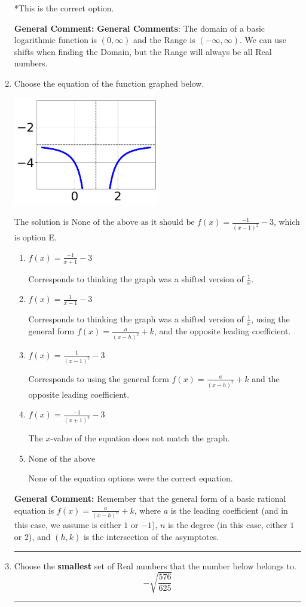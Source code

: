 \documentclass{extbook}[14pt]
\newcommand{\litem}[1]{\item #1

\rule{\textwidth}{0.4pt}}
\begin{document}
\begin{enumerate}
{\begin{enumerate}[label=\Alph*.]
*This is the correct option.
\end{enumerate}

\textbf{General Comment:} \textbf{General Comments}: The domain of a basic logarithmic function is $(0, \infty)$ and the Range is $(-\infty, \infty)$. We can use shifts when finding the Domain, but the Range will always be all Real numbers.
}
\litem{
Choose the equation of the function graphed below.

\begin{center}
    \includegraphics[width=0.5\textwidth]{../Figures/rationalGraphToEquationA.png}
\end{center}




The solution is \( \text{None of the above as it should be } f(x) = \frac{-1}{(x - 1)^2} - 3 \), which is option E.\begin{enumerate}[label=\Alph*.]
\item \( f(x) = \frac{-1}{x + 1} - 3 \)

Corresponds to thinking the graph was a shifted version of $\frac{1}{x}$.
\item \( f(x) = \frac{1}{x - 1} - 3 \)

Corresponds to thinking the graph was a shifted version of $\frac{1}{x}$, using the general form $f(x) = \frac{a}{(x-h)^2}+k$, and the opposite leading coefficient.
\item \( f(x) = \frac{1}{(x - 1)^2} - 3 \)

Corresponds to using the general form $f(x) = \frac{a}{(x-h)^2}+k$ and the opposite leading coefficient.
\item \( f(x) = \frac{-1}{(x + 1)^2} - 3 \)

The $x$-value of the equation does not match the graph.
\item \( \text{None of the above} \)

None of the equation options were the correct equation.
\end{enumerate}

\textbf{General Comment:} Remember that the general form of a basic rational equation is $ f(x) = \frac{a}{(x-h)^n} + k$, where $a$ is the leading coefficient (and in this case, we assume is either $1$ or $-1$), $n$ is the degree (in this case, either $1$ or $2$), and $(h, k)$ is the intersection of the asymptotes.
}
\litem{
Choose the \textbf{smallest} set of Real numbers that the number below belongs to.
\[ -\sqrt{\frac{576}{625}} \]

}
\end{enumerate}
\end{document}
